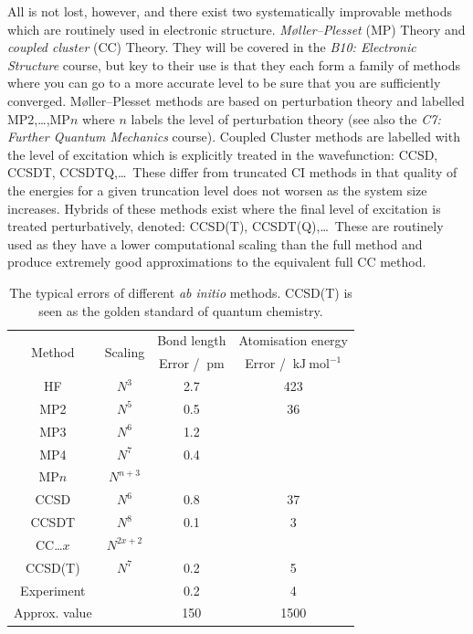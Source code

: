 \documentclass{article}
\theoremstyle{plain}\theoremheaderfont{\normalfont\itshape}\theorembodyfont{\rmfamily}\theoremseparator{.}\newtheorem*{rem}{Remark}\newtheorem*{ex}{Example}\newtheorem*{proof}{Proof}\newtheorem*{altp}{Alternative proof}
\theoremstyle{plain}\theoremheaderfont{\normalfont\bfseries}\theorembodyfont{\rmfamily}\theoremseparator{.}\newtheorem{thm}{Theorem}[section]\newtheorem{lem}[thm]{Lemma}\newtheorem{prop}[thm]{Proposition}\newtheorem*{cor}{Corollary}\newtheorem{defn}[thm]{Definition}\newtheorem{clm}[thm]{Claim}\newtheorem{clminproof}{Claim}\newtheorem{pos}{Postulate}[section]
\theoremstyle{break}\theoremheaderfont{\normalfont\itshape}\theorembodyfont{\rmfamily}\theoremseparator{.\medskip}\newtheorem*{proofskip}{Proof}\newtheorem*{exs}{Examples}\newtheorem*{rems}{Remarks}
\theoremstyle{break}\theoremheaderfont{\normalfont\bfseries}\theorembodyfont{\rmfamily}\theoremseparator{.\medskip}\newtheorem{lemskip}[thm]{Lemma}\newtheorem{defnskip}[thm]{Definition}\newtheorem{propskip}[thm]{Proposition}\newtheorem{thmskip}[thm]{Theorem}
\numberwithin{equation}{section}
\newcommand{\unit}[1]{\ \mathrm{#1}}
\begin{document}
    All is not lost, however, and there exist two systematically improvable methods which are routinely used in electronic structure. \textit{M{\o}ller--Plesset} (MP) Theory and \textit{coupled cluster} (CC) Theory. They will be covered in the \textit{B10: Electronic Structure} course, but key to their use is that they each form a family of methods where you can go to a more accurate level to be sure that you are sufficiently converged. M{\o}ller--Plesset methods are based on perturbation theory and labelled MP2,\dots,MP\(n\) where \(n\) labels the level of perturbation theory (see also the \textit{C7: Further Quantum Mechanics} course). Coupled Cluster methods are labelled with the level of excitation which is explicitly treated in the wavefunction: CCSD, CCSDT, CCSDTQ,\dots\ These differ from truncated CI methods in that quality of the energies for a given truncation level does not worsen as the system size increases. Hybrids of these methods exist where the final level of excitation is treated perturbatively, denoted: CCSD(T), CCSDT(Q),\dots\ These are routinely used as they have a lower computational scaling than the full method and produce extremely good approximations to the equivalent full CC method.

    \renewcommand{\arraystretch}{1}
    \begin{table}
        \centering
        \begin{tabular}{cccc}
            \toprule
            \multirow{2}{*}{Method} & \multirow{2}{*}{Scaling} & Bond length & Atomisation energy \\
            ~ & ~ & Error / \(\!\unit{pm}\) & Error / \(\!\unit{kJ}\unit{mol}^{-1}\) \\ \midrule
            HF & \(N^3\) & 2.7 & 423 \\
            MP2 & \(N^5\) & 0.5 & 36 \\
            MP3 & \(N^6\) & 1.2 & ~ \\
            MP4 & \(N^7\) & 0.4 & ~ \\
            MP\(n\) & \(N^{n+3}\) & ~ & ~ \\
            CCSD & \(N^6\) & 0.8 & 37 \\
            CCSDT & \(N^8\) & 0.1 & 3 \\
            CC\dots\(x\) & \(N^{2x+2}\) & ~ & ~ \\
            CCSD(T) & \(N^7\) & 0.2 & 5 \\ \midrule
            Experiment & ~ & 0.2 & 4 \\ \midrule
            Approx. value & ~ & 150 & 1500 \\ \bottomrule
        \end{tabular}
        \caption{The typical errors of different \textit{ab initio} methods. CCSD(T) is seen as the golden standard of quantum chemistry.}
    \end{table}
\end{document}

